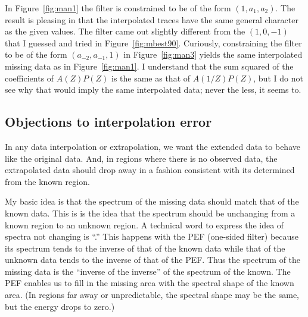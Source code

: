 \par
In Figure~\ref{fig:man1} the filter is constrained
to be of the form $(1,a_1,a_2)$.
The result is pleasing in that the interpolated traces
have the same general character as the given values.
The filter came out slightly different from the $(1,0,-1)$
that I guessed and tried in Figure~\ref{fig:mbest90}.
Curiously, constraining the filter to be of the form $(a_{-2},a_{-1},1)$
in Figure~\ref{fig:man3}
yields the same interpolated missing data as in Figure~\ref{fig:man1}.
I understand that the sum squared of the coefficients
of $A(Z)P(Z)$ is the same as that of $A(1/Z)P(Z)$, but I
do not see why that would imply the same interpolated data;
never the less, it seems to.

\subsection{Objections to interpolation error}
\par
In any data interpolation or extrapolation,
we want the extended data to behave like the original data.
And, in regions where there is no observed data,
the extrapolated data should drop away in a fashion
consistent with its  determined from the known region.

\par
My basic idea is that the spectrum of the missing data
should match that of the known data.
This is is the idea that the spectrum should be unchanging
from a known region to an unknown region.
A technical word to express the idea
of spectra not changing is ``.''
This happens with the PEF (one-sided filter)
because its spectrum tends to the inverse of that of the known data
while that of the unknown data
tends to the inverse of that of the PEF.
Thus the spectrum of the missing data
is the ``inverse of the inverse'' of the spectrum of the known.
The PEF enables us to fill in the missing area with
the spectral shape of the known area.
(In regions far away or unpredictable,
the spectral shape may be the same, but the energy drops to zero.)


